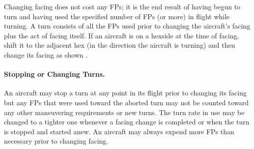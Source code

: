 Changing facing does not cost any FPs; it is the end result of having begun to turn and having used the specified number of FPs (or more) in flight while turning. A turn consists of all the FPs used prior to changing the aircraft's facing plus the act of facing itself. If an aircraft is on a hexside at the time of facing, shift it to the adjacent hex (in the direction the aircraft is turning) and then change its facing as shown . 


\paragraph{Stopping or Changing Turns.} An aircraft may stop a turn at any point in its flight prior to changing its facing but any FPs that were used toward the aborted turn may not be counted toward any other maneuvering requirements or new turns. The turn rate in use may be changed to a tighter one whenever a facing change is completed or when the turn is stopped and started anew. An aircraft may always expend more FPs than necessary prior to changing facing.

